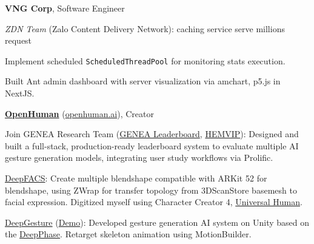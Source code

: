 \cvspace

\begin{twocolentry}{
	}
	\textbf{VNG Corp}, Software Engineer
	
	\textit{ZDN Team} (Zalo Content Delivery Network): caching service serve millions request
	\begin{highlights}
		\item Implement scheduled \texttt{ScheduledThreadPool} for monitoring stats execution.
		\item Built Ant admin dashboard with server visualization via amchart, p5.js in NextJS.
	\end{highlights}
\end{twocolentry}

\begin{twocolentry}{
	}
	\href{https://www.linkedin.com/company/openhuman/}{\textbf{OpenHuman}} (\href{https://openhuman.ai}{openhuman.ai}), Creator
	
	\begin{highlights}
		\item Join GENEA Research Team (\href{https://genealeaderboard.github.io}{GENEA Leaderboard}, \href{https://github.com/hemvip/hemvip.github.io}{HEMVIP}): Designed and built a full-stack, production-ready leaderboard system to evaluate multiple AI gesture generation models, integrating user study workflows via Prolific.
		
		
		
		\item  \href{https://github.com/DeepFACS}{DeepFACS}: Create multiple blendshape compatible with ARKit 52 for blendshape, using ZWrap for transfer topology from 3DScanStore basemesh to facial expression. Digitized myself using Character Creator 4, \href{https://www.instagram.com/p/DKMV3xwJcQm}{Universal Human}.
		
	
		
		\item \href{https://github.com/DeepGesture/DeepGesture-Unity}{DeepGesture} (\href{https://www.youtube.com/watch?v=eZghfNGmZn8}{Demo}): Developed gesture generation AI system on Unity based on the \href{https://www.youtube.com/watch?v=YhH4PYEkVnY}{DeepPhase}. Retarget skeleton animation using MotionBuilder.
		
	\end{highlights}
	
\end{twocolentry}
